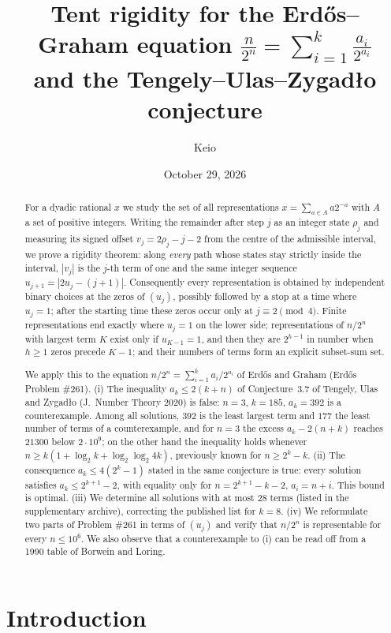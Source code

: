 \documentclass[11pt]{amsart}
\title[Tent rigidity for the Erd\H{o}s--Graham equation]{Tent rigidity for the Erd\H{o}s--Graham equation $\frac{n}{2^n}=\sum_{i=1}^k\frac{a_i}{2^{a_i}}$\\ and the Tengely--Ulas--Zygad\l{}o conjecture}
\author{Keio}
\date{October 29, 2026}
\theoremstyle{definition}
\theoremstyle{remark}
\begin{document}
\begin{abstract}
For a dyadic rational $x$ we study the set of all representations $x=\sum_{a\in A}a2^{-a}$ with $A$ a set of positive integers. Writing the remainder after step $j$ as an integer state $\rho_j$ and measuring its signed offset $v_j=2\rho_j-j-2$ from the centre of the admissible interval, we prove a rigidity theorem: along \emph{every} path whose states stay strictly inside the interval, $|v_j|$ is the $j$-th term of one and the same integer sequence
$u_{j+1}=|2u_j-(j+1)|$.
Consequently every representation is obtained by independent binary choices at the zeros of $(u_j)$, possibly followed by a stop at a time where $u_j=1$; after the starting time these zeros occur only at $j\equiv 2\pmod 4$. Finite representations end exactly where $u_j=1$ on the lower side; representations of $n/2^n$ with largest term $K$ exist only if $u_{K-1}=1$, and then they are $2^{h-1}$ in number when $h\ge1$ zeros precede $K-1$; and their numbers of terms form an explicit subset-sum set.

We apply this to the equation $n/2^n=\sum_{i=1}^k a_i/2^{a_i}$ of Erd\H{o}s and Graham (Erd\H{o}s Problem \#261). (i) The inequality $a_k\le 2(k+n)$ of Conjecture~3.7 of Tengely, Ulas and Zygad\l{}o (J.~Number Theory 2020) is false: $n=3$, $k=185$, $a_k=392$ is a counterexample. Among all solutions, $392$ is the least largest term and $177$ the least number of terms of a counterexample, and for $n=3$ the excess $a_k-2(n+k)$ reaches $21300$ below $2\cdot10^9$; on the other hand the inequality holds whenever $n\ge k(1+\log_2k+\log_2\log_2 4k)$, previously known for $n\ge 2^k-k$. (ii) The consequence $a_k\le 4(2^k-1)$ stated in the same conjecture is true: every solution satisfies $a_k\le 2^{k+1}-2$, with equality only for $n=2^{k+1}-k-2$, $a_i=n+i$. This bound is optimal. (iii) We determine all solutions with at most $28$ terms (listed in the supplementary archive), correcting the published list for $k=8$. (iv) We reformulate two parts of Problem \#261 in terms of $(u_j)$ and verify that $n/2^n$ is representable for every $n\le 10^6$. We also observe that a counterexample to (i) can be read off from a 1990 table of Borwein and Loring.
\end{abstract}

\maketitle

\section{Introduction}
\end{document}
